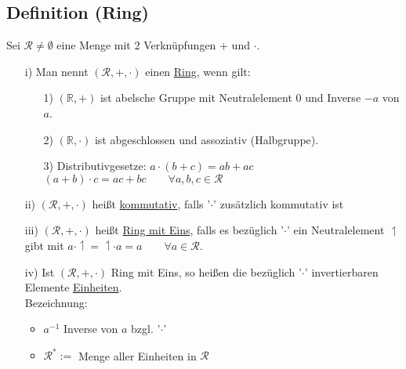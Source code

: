 \documentclass[12pt,titlepage, pdf]{article}
\newcommand{\R}{\mathds{R}}
\newcommand{\uline}[1]{\underline{#1}}
\renewcommand{\>}{\rightarrow}
\renewcommand{\*}{\cdot}
\begin{document}
	\subsection{Definition (Ring)}
	Sei $\mathcal{R} \neq \emptyset$ eine Menge mit 2 Verknüpfungen + und $\cdot$.
	\begin{itemize}
		\item[i)] Man nennt $(\mathcal{R}, + , \cdot)$ einen \uline{Ring}, wenn gilt: 
		\begin{itemize}
			\item[1)] $(\R, + )$ ist abelsche Gruppe mit Neutralelement 0 und Inverse $-a$ von $a$.
			\item[2)] $(\R, \cdot)$ ist abgeschlossen und assoziativ (Halbgruppe).
			\item[3)] Distributivgesetze: $a \cdot (b+c) = ab + ac$\\
			\noindent\hspace*{32.5mm}$ (a+b) \cdot c = ac + bc \qquad \forall a,b,c \in \mathcal{R}$
		\end{itemize}
		\item[ii)] $(\mathcal{R},+,\cdot)$ heißt \uline{kommutativ}, falls '$\cdot$' zusätzlich kommutativ ist
		\item[iii)] $(\mathcal{R},+,\cdot)$ heißt \uline{Ring mit Eins}, falls es bezüglich '$\cdot$' ein Neutralelement $\upharpoonleft$ gibt mit $a \cdot \upharpoonleft = \upharpoonleft \cdot a = a \qquad \forall a \in \mathcal{R}$.
		\item[iv)] Ist $(\mathcal{R},+,\cdot)$ Ring mit Eins, so heißen die bezüglich '$\cdot$' invertierbaren Elemente \uline{Einheiten}. \\
		Bezeichnung: 
		\begin{itemize}
			\item $a^{-1}$ Inverse von $a$ bzgl. '$\cdot$' \item $\mathcal{R}^* :=$ Menge aller Einheiten in $\mathcal{R}$
		\end{itemize}
	\end{itemize}
\end{document}
